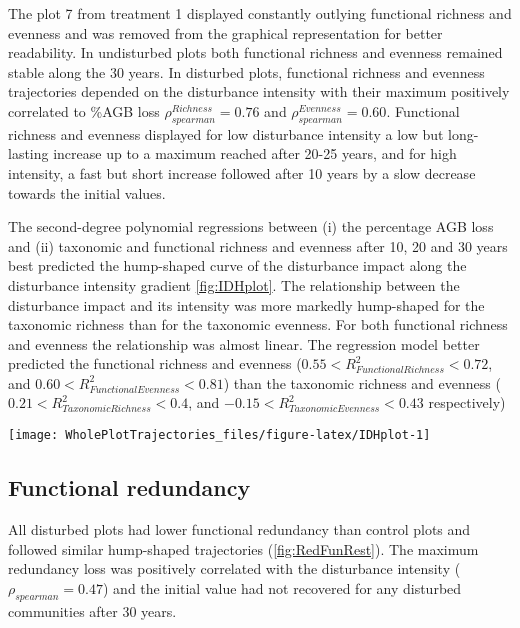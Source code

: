 \documentclass[fleqn,10pt]{ArtEcoFoG} %
\begin{document}
The plot 7 from treatment 1 displayed constantly outlying functional
richness and evenness and was removed from the graphical representation
for better readability. In undisturbed plots both functional richness
and evenness remained stable along the 30 years. In disturbed plots,
functional richness and evenness trajectories depended on the
disturbance intensity with their maximum positively correlated to \%AGB
loss \(\rho_{spearman}^{Richness}=0.76\) and
\(\rho_{spearman}^{Evenness}=0.60\). Functional richness and evenness
displayed for low disturbance intensity a low but long-lasting increase
up to a maximum reached after 20-25 years, and for high intensity, a
fast but short increase followed after 10 years by a slow decrease
towards the initial values.

The second-degree polynomial regressions between (i) the percentage AGB
loss and (ii) taxonomic and functional richness and evenness after 10,
20 and 30 years best predicted the hump-shaped curve of the disturbance
impact along the disturbance intensity gradient \ref{fig:IDHplot}. The
relationship between the disturbance impact and its intensity was more
markedly hump-shaped for the taxonomic richness than for the taxonomic
evenness. For both functional richness and evenness the relationship was
almost linear. The regression model better predicted the functional
richness and evenness (\(0.55<R^2_{Functional Richness}<0.72\), and
\(0.60<R^2_{Functional Evenness}<0.81\)) than the taxonomic richness and
evenness (\(0.21<R^2_{Taxonomic Richness}<0.4\), and
\(-0.15<R^2_{Taxonomic Evenness}<0.43\) respectively)

\begin{figure*}

{\centering \texttt{[image: WholePlotTrajectories\_files/figure-latex/IDHplot-1]} 

}

\caption{Relationship between the initial \%AGB loss and community taxonomic richness \textbf{(a)}, taxonomic evenness \textbf{(b)}, functional richness \textbf{(c)},and functional evenness \textbf{(d)} at 10, 20 and 30 years after disturbance}\label{fig:IDHplot}
\end{figure*}

\subsection{Functional redundancy}\label{functional-redundancy}

All disturbed plots had lower functional redundancy than control plots
and followed similar hump-shaped trajectories (\ref{fig:RedFunRest}).
The maximum redundancy loss was positively correlated with the
disturbance intensity (\(\rho_{spearman}=0.47\)) and the initial value
had not recovered for any disturbed communities after 30 years.
\end{document}
